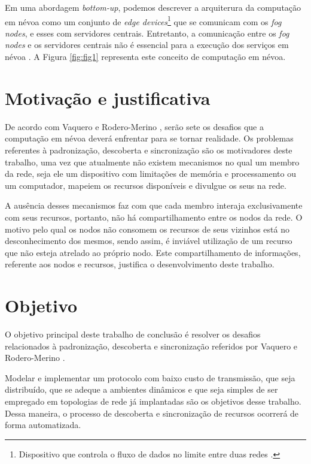 Em uma abordagem \textit{bottom-up}, podemos descrever a arquiterura da computação em névoa como um conjunto de \textit{edge devices}\footnote{Dispositivo que controla o fluxo de dados no limite entre duas redes \cite{edgeDevices}.} que se comunicam com os \textit{fog nodes}, e esses com servidores centrais.
Entretanto, a comunicação entre os \textit{fog nodes} e os servidores centrais não é essencial para a execução dos serviços em névoa \cite{DBLP:journals/corr/RomanLM16}.
A Figura \ref{fig:fig1} representa este conceito de computação em névoa.

\section{Motivação e justificativa}

De acordo com Vaquero e Rodero-Merino \cite{Vaquero:2014}, serão sete os desafios que a computação em névoa deverá enfrentar para se tornar realidade.
Os problemas referentes à padronização, descoberta e sincronização são os motivadores deste trabalho, uma vez que atualmente não existem mecanismos
no qual um membro da rede, seja ele um dispositivo com limitações de memória e processamento ou um computador, mapeiem os recursos disponíveis e divulgue os seus na rede.

A ausência desses mecanismos faz com que cada membro interaja exclusivamente com seus recursos, portanto, não há compartilhamento entre os nodos da rede.
O motivo pelo qual os nodos não consomem os recursos de seus vizinhos está no desconhecimento dos mesmos, sendo assim, é inviável utilização de um recurso que não esteja atrelado ao próprio nodo.
Este compartilhamento de informações, referente aos nodos e recursos, justifica o desenvolvimento deste trabalho.


\section{Objetivo}

O objetivo principal deste trabalho de conclusão é resolver os desafios relacionados à padronização, descoberta e sincronização referidos por Vaquero e Rodero-Merino \cite{Vaquero:2014}.

Modelar e implementar um protocolo com baixo custo de transmissão, que seja distribuído, que se adeque a ambientes dinâmicos e que seja simples de ser
empregado em topologias de rede já implantadas são os objetivos desse trabalho. Dessa maneira, o processo de descoberta e sincronização de recursos ocorrerá de forma automatizada.